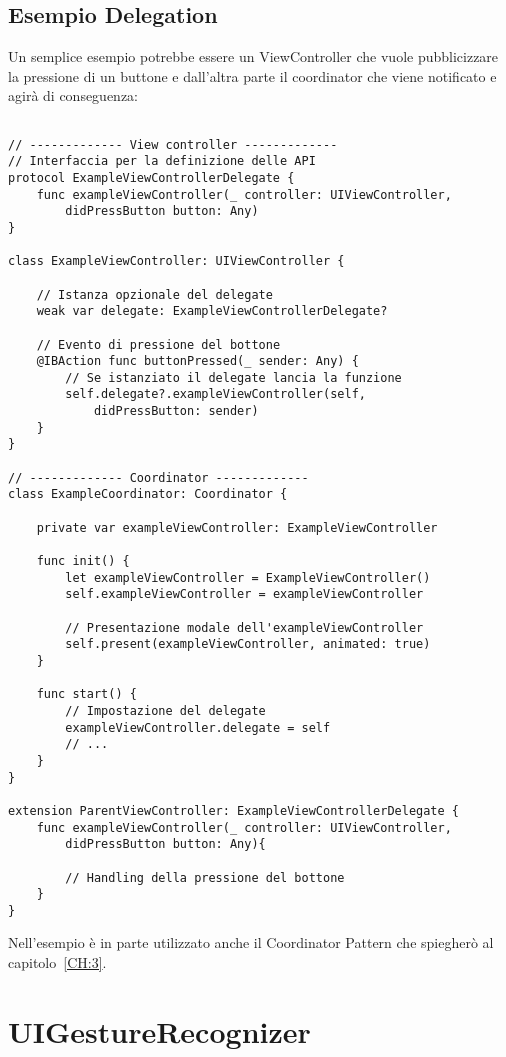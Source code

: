 \subsection{Esempio Delegation}

Un semplice esempio potrebbe essere un ViewController che vuole
pubblicizzare la pressione di un buttone e dall'altra parte il coordinator
che viene notificato e agirà di conseguenza:

\begin{verbatim}

// ------------- View controller -------------
// Interfaccia per la definizione delle API
protocol ExampleViewControllerDelegate {
    func exampleViewController(_ controller: UIViewController,
        didPressButton button: Any)
}

class ExampleViewController: UIViewController {

    // Istanza opzionale del delegate
    weak var delegate: ExampleViewControllerDelegate?

    // Evento di pressione del bottone
    @IBAction func buttonPressed(_ sender: Any) {
        // Se istanziato il delegate lancia la funzione
        self.delegate?.exampleViewController(self,
            didPressButton: sender)
    }
}

// ------------- Coordinator -------------
class ExampleCoordinator: Coordinator {

    private var exampleViewController: ExampleViewController

    func init() {
        let exampleViewController = ExampleViewController()
        self.exampleViewController = exampleViewController

        // Presentazione modale dell'exampleViewController
        self.present(exampleViewController, animated: true)
    }

    func start() {
        // Impostazione del delegate
        exampleViewController.delegate = self
        // ...
    }
}

extension ParentViewController: ExampleViewControllerDelegate {
    func exampleViewController(_ controller: UIViewController,
        didPressButton button: Any){
        
        // Handling della pressione del bottone
    }
}
\end{verbatim}

Nell'esempio è in parte utilizzato anche il Coordinator Pattern che spiegherò al capitolo~\ref{CH:3}.

\section{UIGestureRecognizer}

